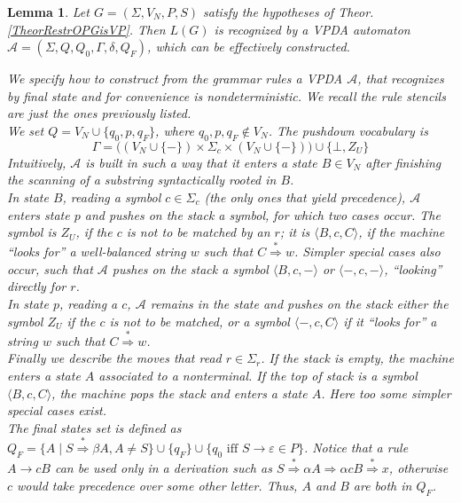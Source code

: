 \documentclass[3p,11pt]{elsarticle}
\newtheorem{lemma}[theorem]{Lemma}
\newenvironment{proof}[1][Proof]{\begin{trivlist}
\item[\hskip \labelsep {\bfseries #1}]}{\end{trivlist}}
\begin{document}
\begin{lemma}\label{LemmaRestrOPG2VPA}
Let $G=(\Sigma, V_N, P, S)$  satisfy the hypotheses of Theor. \ref{TheorRestrOPGisVP}. Then $L(G)$ is recognized by a VPDA automaton $\mathcal{A}=(\Sigma, Q, Q_0, \Gamma, \delta, Q_F)$, which can be effectively constructed.
 \begin{proof}
  We specify how to construct from the grammar rules a VPDA $\mathcal{A}$, that recognizes by final state and for convenience is nondeterministic. We recall the rule stencils are just the ones previously listed.
\\
We set $Q= V_N \cup \{q_0,p,q_F\}$, where  $q_0, p ,q_F \not\in V_N$. The pushdown vocabulary is
$$
\Gamma = \big( \left(V_N \cup \{-\} \right)  \times  \Sigma_c \times \left(V_N \cup \{-\} \right) \big) \cup \{\bot, Z_U\}
$$
Intuitively, $\mathcal{A}$ is built in such a way that it enters a state $B\in V_N$ after finishing the scanning of a substring syntactically rooted in $B$.
\\
In state $B$, reading a symbol  $c\in \Sigma_c$ (the only ones that yield precedence), $\mathcal{A}$ enters state $p$  and pushes  on the stack a symbol, for which two cases occur. The symbol is $Z_U$, if the $c$ is not to be matched by an $r$; it is $\langle B, c, C\rangle$, if the machine ``looks for'' a well-balanced string $w$ such that $C\stackrel{\ast}{\Rightarrow}w$. Simpler special cases also occur, such that $\mathcal{A}$ pushes on the stack a symbol $\langle B, c, -\rangle$ or $\langle -, c, -\rangle$, ``looking'' directly for $r$.
\\
In state $p$, reading a $c$,  $\mathcal{A}$ remains in the state and pushes on the stack either the symbol $Z_U$ if the $c$ is not to be matched, or a symbol $\langle -, c, C\rangle$ if it ``looks for'' a string $w$ such that $C\stackrel{\ast}{\Rightarrow}w$.
\\
Finally we describe the moves that read $r\in \Sigma_r$. If the stack is empty, the machine  enters a state $A$ associated to a nonterminal. If the top of stack is a symbol $\langle B, c, C\rangle$, the machine pops the stack and enters a state $A$. Here too some simpler special cases exist.
\\
The final states set is defined as $Q_F= \{A \mid S\stackrel{\ast}{\Rightarrow} \beta A, A\neq S \} \cup \{q_F\} \cup \{q_0 \text{ iff } S\to \varepsilon \in P\}$. Notice that a rule $A\to c B$ can be used only in a derivation  such as $S\stackrel{\ast}{\Rightarrow} \alpha A \Rightarrow \alpha c B \stackrel{\ast}{\Rightarrow} x$, otherwise $c$ would take precedence over some other letter. Thus, $A$ and $B$ are both in $Q_F$.


\end{proof}
\end{lemma}
\end{document}

